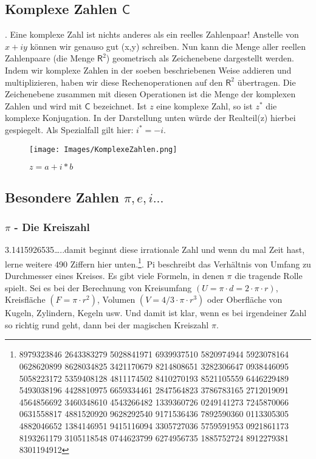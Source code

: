 \documentclass{scrreprt}
\begin{document}
\subsection{Komplexe Zahlen $\mathsf{C}$}\label{Komplexe Zahlen}
.
\vspace{0.3cm} 
Eine komplexe Zahl ist nichts anderes als ein reelles Zahlenpaar! Anstelle von $x+iy$ können wir genauso gut (x,y) schreiben. Nun kann die Menge aller reellen Zahlenpaare (die Menge $\mathsf{R}^2$) geometrisch als Zeichenebene dargestellt werden. Indem wir komplexe Zahlen in der soeben beschriebenen Weise addieren und multiplizieren, haben wir diese Rechenoperationen auf den $\mathsf{R}^2$ übertragen. Die Zeichenebene zusammen mit diesen Operationen ist die Menge der komplexen Zahlen und wird mit $\mathsf{C}$ bezeichnet.
Ist $z$ eine komplexe Zahl, so ist $z^*$ die komplexe Konjugation. In der Darstellung unten würde der Realteil(z) hierbei gespiegelt.
Als Spezialfall gilt hier: $i^*=-i$.
\begin{figure}[h]
    \centering
    \texttt{[image: Images/KomplexeZahlen.png]}
    \caption{$z=a+i*b$}
    \label{Figur 2}
\end{figure}
\subsection{Besondere Zahlen $\pi, e, i...$}\label{Besondere Zahlen}
\subsubsection{$\pi$ - Die Kreiszahl}\label{Die Kreiszahl}
3.1415926535\dots ..damit beginnt diese irrationale Zahl und wenn du mal Zeit hast, lerne weitere 490 Ziffern 
hier unten.\footnote{8979323846 2643383279 5028841971 6939937510 5820974944 5923078164 0628620899 8628034825 3421170679 8214808651 3282306647 0938446095 5058223172 5359408128 4811174502 8410270193 8521105559 6446229489 5493038196 4428810975 6659334461 2847564823 3786783165 2712019091 4564856692 3460348610 4543266482 1339360726 0249141273 7245870066 0631558817 4881520920 9628292540 9171536436 7892590360 0113305305 4882046652 1384146951 9415116094 3305727036 5759591953 0921861173 8193261179 3105118548 0744623799 6274956735 1885752724 8912279381 8301194912}.
Pi beschreibt das Verhältnis von Umfang zu Durchmesser eines Kreises. Es gibt viele Formeln, in denen $\pi$ die tragende Rolle spielt. Sei es bei der Berechnung von Kreisumfang $(U = \pi·d = 2·\pi·r)$, Kreisfläche $(F = \pi·r^2)$, Volumen $(V = 4/3·\pi·r^3)$ oder Oberfläche von Kugeln, Zylindern, Kegeln usw. Und damit ist klar, wenn es bei irgendeiner Zahl so richtig rund geht, dann bei der magischen Kreiszahl $\pi$.
\end{document}
